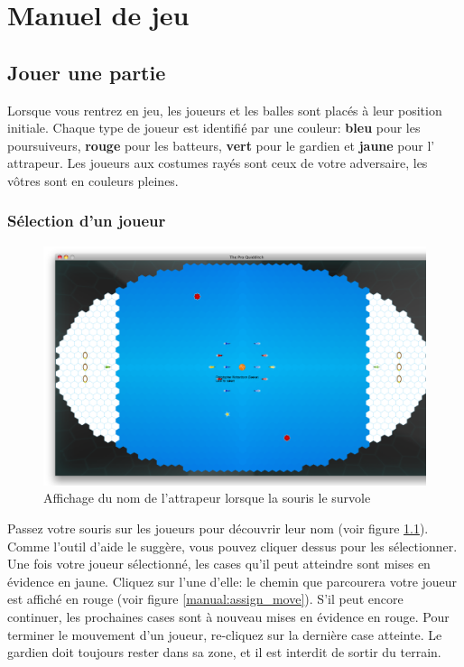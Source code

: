 \chapter{Manuel de jeu}
\section{Jouer une partie}
Lorsque vous rentrez en jeu, les joueurs et les balles sont placés à leur position initiale. Chaque type de joueur est identifié par une couleur: 
\textbf{bleu} pour les \gls{poursuiveur}s, \textbf{rouge} pour les \gls{batteur}s, \textbf{vert} pour le \gls{gardien} et \textbf{jaune} pour l' 
\gls{attrapeur}. 
Les joueurs aux costumes rayés sont ceux de votre adversaire, les vôtres sont en couleurs pleines.

\subsection{Sélection d'un joueur}
\begin{figure}[h!]
    \centering
    \includegraphics[width=\textwidth]{../screenshots/hover_seeker.png}
    \caption{\label{manual:view_name} Affichage du nom de l'attrapeur lorsque la souris le survole}
\end{figure}

Passez votre souris sur les joueurs pour découvrir leur nom (voir figure \ref{manual:view_name}). Comme l'outil d'aide le suggère, vous pouvez cliquer dessus pour les sélectionner. Une fois votre joueur sélectionné, les cases qu'il peut atteindre sont mises en évidence en jaune. Cliquez sur l'une d'elle: le chemin que parcourera votre joueur est affiché en rouge (voir figure \ref{manual:assign_move}). S'il peut encore continuer, les prochaines cases sont à nouveau mises en évidence en rouge. Pour terminer le mouvement d'un joueur, re-cliquez sur la dernière case atteinte. Le gardien doit toujours rester dans sa zone, et il est interdit de sortir du terrain.

